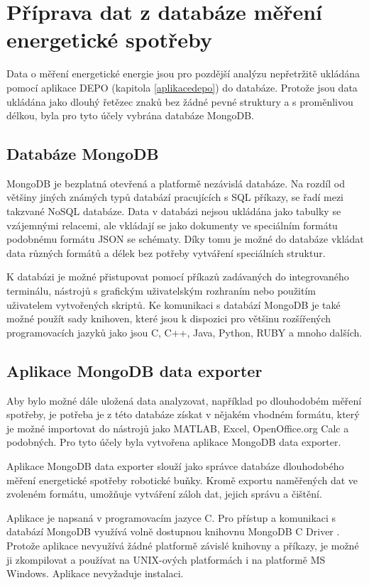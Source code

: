 \chapter{Příprava dat z databáze měření energetické spotřeby}

Data o měření energetické energie jsou pro pozdější analýzu nepřetržitě ukládána pomocí aplikace DEPO (kapitola \ref{aplikacedepo}) do databáze. Protože jsou data ukládána jako dlouhý řetězec znaků bez žádné pevné struktury a s proměnlivou délkou, byla pro tyto účely vybrána databáze MongoDB. 

\section{Databáze MongoDB}

MongoDB je bezplatná otevřená a platformě nezávislá databáze. Na rozdíl od většiny jiných známých typů databází pracujících s SQL příkazy, se řadí mezi takzvané NoSQL databáze. Data v databázi nejsou ukládána jako tabulky se vzájemnými relacemi, ale vkládají se jako dokumenty ve speciálním formátu podobnému formátu JSON se schématy. Díky tomu je možné do databáze vkládat data různých formátů a délek bez potřeby vytváření speciálních struktur. 

K databázi je možné přistupovat pomocí příkazů zadávaných do integrovaného terminálu, nástrojů s grafickým uživatelským rozhraním nebo použitím uživatelem vytvořených skriptů. Ke komunikaci s databází MongoDB je také možné použít sady knihoven, které jsou k dispozici pro většinu rozšířených programovacích jazyků jako jsou C, C++, Java, Python, RUBY a mnoho dalších.     

\section{Aplikace MongoDB data exporter}

Aby bylo možné dále uložená data analyzovat, například po dlouhodobém měření spotřeby, je potřeba je z této databáze získat v nějakém vhodném formátu, který je možné importovat do nástrojů jako MATLAB, Excel, OpenOffice.org Calc a podobných. Pro tyto účely byla vytvořena aplikace MongoDB data exporter. 

Aplikace MongoDB data exporter slouží jako správce databáze dlouhodobého měření energetické spotřeby robotické buňky. Kromě exportu naměřených dat ve zvoleném formátu, umožňuje vytváření záloh dat, jejich správu a čištění. 

Aplikace je napsaná v programovacím jazyce C. Pro přístup a komunikaci s databází MongoDB využívá volně dostupnou knihovnu MongoDB C Driver \cite{mongocdriver}. Protože aplikace nevyužívá žádné platformě závislé knihovny a příkazy, je možné ji zkompilovat a používat na UNIX-ových platformách i na platformě MS Windows. Aplikace nevyžaduje instalaci. 

